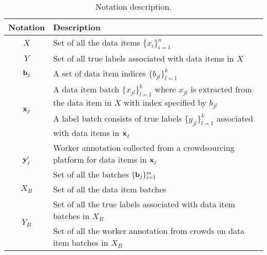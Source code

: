 


\begin{table}[!t]
\centering
 {\caption{Notation description.}\label{tab:notation}}
{
  \begin{tabular}{@{}c@{}||p{6.8cm}}
  \hline    
  Notation & Description \\ \hline \hline
  $X$      & Set of all the data items $\{x_i\}_{i=1}^n$  \\ \hline
  $Y$      & Set of all true labels associated with data items in $X$ \\ \hline
  ${\mathbf{b}}_j$    & A set of data item indices $\{b_{jl}\}_{l=1}^{k}$ \\ \hline
  \multirow{2}{*}{${\mathbf{x}}_j$}    & A data item batch $\{x_{jl}\}_{l=1}^{k}$ where $x_{jl}$ is extracted from the data item in $X$ with index specified by $b_{jl}$ \\ \hline
  \multirow{2}{*}{$\by_j$}    & A label batch consists of true labels $\{y_{jl}\}_{l=1}^{k}$ associated with data items in ${\mathbf{x}}_j$ \\ \hline
  \multirow{2}{*}{${\mathbf{y}}_j'$}   & Worker annotation collected from a crowdsourcing platform for data items in ${\mathbf{x}}_j$ \\ \hline
  $B$      & Set of all the batches $\{{\mathbf{b}}_j\}_{i=1}^m$ \\ \hline
  $X_B$    & Set of all the data item batches \\ \hline
  \multirow{2}{*}{$Y_B$}    & Set of all the true labels associated with data item batches in $X_B$ \\ \hline
  \multirow{2}{*}{$Y_B'$}   & Set of all the worker annotation from crowds on data item batches in $X_B$ \\ \hline
  \end{tabular}
}
\end{table}
